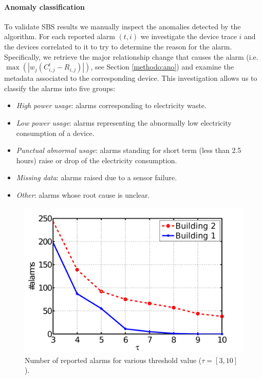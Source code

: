 \paragraph{Anomaly classification}
To validate SBS results we manually inspect the anomalies detected by the algorithm.  
For each reported alarm $(t,i)$ we investigate the device trace $i$ and the devices correlated to it to try
to determine the reason for the alarm.
Specifically, we retrieve the major relationship change that causes the alarm (i.e. $\max(|w_j(C_{i,j}^t - R_{i,j})|)$, 
see Section \ref{methodo:ano}) and examine the metadata associated to the corresponding device.
This investigation allows us to classify the alarms into five groups:
\begin{itemize}
 \item \emph{High power usage}: alarms corresponding to electricity waste.
 \item \emph{Low power usage}: alarms representing the abnormally low electricity consumption of a device.
 \item \emph{Punctual abnormal usage}: alarms standing for short term (less than 2.5 hours) raise or drop of the electricity consumption.
 \item \emph{Missing data}: alarms raised due to a sensor failure.
 \item \emph{Other}: alarms whose root cause is unclear.
\end{itemize}


\begin{figure}
\begin{center}
 \includegraphics[width=.49\textwidth]{img/threshold-eps-converted-to.pdf}
 \caption{Number of reported alarms for various threshold value ($\tau=[3,10]$).}
 \label{fig:thres}
 \end{center}
\end{figure}

